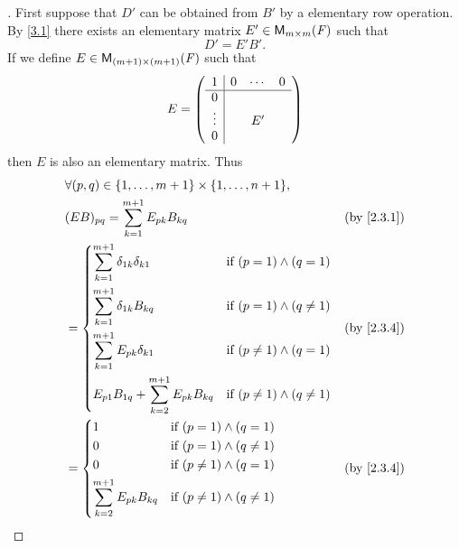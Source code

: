 \begin{proof}[]
  First suppose that \(D'\) can be obtained from \(B'\) by a elementary row operation.
  By \cref{3.1} there exists an elementary matrix \(E' \in \mathsf{M}_{{m} \times m}({\mathit{F}})\) such that
  \[
    D' = E' B'.
  \]
  If we define \(E \in \mathsf{M}_{{(m + 1)} \times (m + 1)}({\mathit{F}})\) such that
  \[
    E = \left\lparen\begin{array}{c|ccc}
        1      & 0 & \cdots & 0 \\
        \hline
        0      &   &        &   \\
        \vdots &   & E'     &   \\
        0      &   &        &
      \end{array}\right\rparen
  \]
  then \(E\) is also an elementary matrix.
  Thus
  \begin{align*}
     & \forall (p, q) \in \set{1, \dots, m + 1} \times \set{1, \dots, n + 1},                                                           \\
     & (E B)_{p q} = \sum_{k = 1}^{m + 1} E_{p k} B_{k q}                                                 &  & \text{(by \cref{2.3.1})} \\
     & = \begin{dcases}
           \sum_{k = 1}^{m + 1} \delta_{1 k} \delta_{k 1}         & \text{if } (p = 1) \land (q = 1)       \\
           \sum_{k = 1}^{m + 1} \delta_{1 k} B_{k q}              & \text{if } (p = 1) \land (q \neq 1)    \\
           \sum_{k = 1}^{m + 1} E_{p k} \delta_{k 1}              & \text{if } (p \neq 1) \land (q = 1)    \\
           E_{p 1} B_{1 q} + \sum_{k = 2}^{m + 1} E_{p k} B_{k q} & \text{if } (p \neq 1) \land (q \neq 1)
         \end{dcases} &  & \text{(by \cref{2.3.4})}                                \\
     & = \begin{dcases}
           1                                    & \text{if } (p = 1) \land (q = 1)       \\
           0                                    & \text{if } (p = 1) \land (q \neq 1)    \\
           0                                    & \text{if } (p \neq 1) \land (q = 1)    \\
           \sum_{k = 2}^{m + 1} E_{p k} B_{k q} & \text{if } (p \neq 1) \land (q \neq 1)
         \end{dcases}                   &  & \text{(by \cref{2.3.4})}                                                  \\

\end{align*}
\end{proof}
